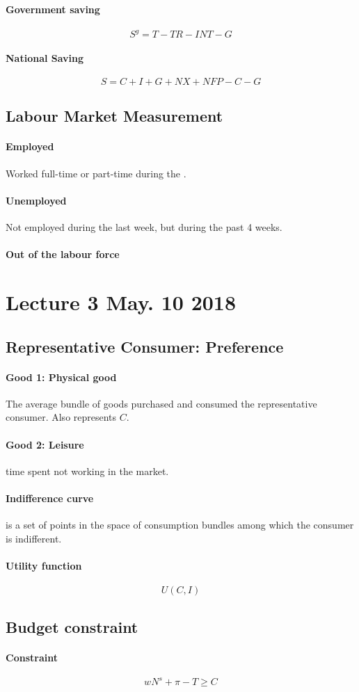 \documentclass[11pt]{article}
\begin{document}
	\paragraph{Government saving}
	\[
		S^g = T - TR - INT - G
	\]
	\paragraph{National Saving}
	\[
		S = C + I + G + NX + NFP - C - G
	\]
	
\subsection{Labour Market Measurement}
	\paragraph{Employed} Worked full-time or part-time during the .
	\paragraph{Unemployed} Not employed during the last week, but  during the past 4 weeks.
	\paragraph{Out of the labour force}
	
\section{Lecture 3 May. 10 2018}
	\subsection{Representative Consumer: Preference}
	\paragraph{Good 1: Physical good} The average bundle of goods purchased and consumed the representative consumer. Also represents  $C$.
	\paragraph{Good 2: Leisure} time spent not working in the market.
	
	\paragraph{Indifference curve} is a set of points in the space of consumption bundles among which the consumer is indifferent.
	
	\paragraph{Utility function}
	\[
		U(C, I)
	\]
	
	\subsection{Budget constraint}
	\paragraph{Constraint}
	\[
		w N^s + \pi - T \geq C
	\]
\end{document}

